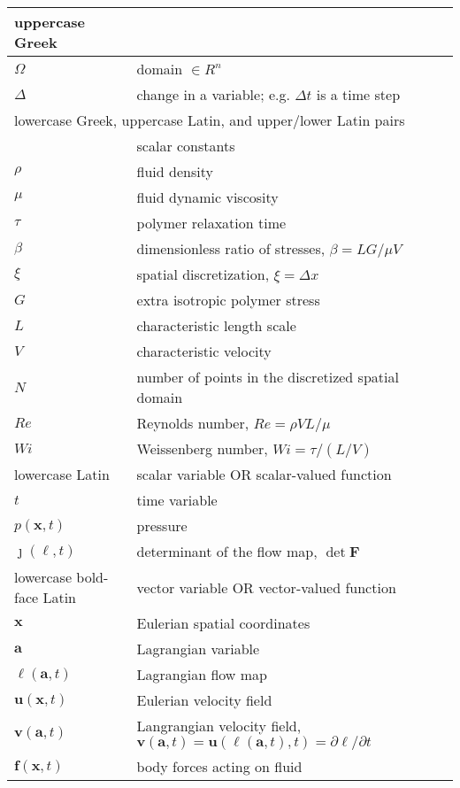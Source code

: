 \documentclass[12pt]{article}
\newcommand{\bx}{{\mathbf x}}
\newcommand{\ba}{{\mathbf a}}
\newcommand{\bl}{{\pmb \ell}}
\newcommand{\bu}{{\mathbf u}}
\newcommand{\bv}{{\mathbf v}}
\newcommand{\ff}{{\mathbf f}}
\newcommand{\bF}{{\mathbf F}}
\begin{document}
	\begin{center}
	\begin{tabular}{|ll|}
		\hline
		uppercase Greek &   \\
		\hline
		$\Omega$ & domain $ \in R^n$\\
		$\Delta$ & change in a variable; e.g. $\Delta t$ is a time step\\
		\hline
		\multicolumn{2}{|l|}{lowercase Greek, uppercase Latin, and upper/lower Latin pairs} \\
		&  scalar constants \\
		\hline
		$\rho$ & fluid density\\
		$\mu$ & fluid dynamic viscosity\\
		$\tau$ & polymer relaxation time\\
		$\beta$ & dimensionless ratio of stresses, $\beta = LG/\mu V$\\
		$\xi$ & spatial discretization, $\xi = \Delta x$\\
		\hline
		$G$ & extra isotropic polymer stress\\
		$L$ & characteristic length scale\\
		$V$ & characteristic velocity \\
		$N$ & number of points in the discretized spatial domain \\
		\hline
		$Re$ & Reynolds number, $ Re = \rho V L/ \mu$ \\
		$Wi$ & Weissenberg number, $ Wi = \tau/(L/V)$ \\
		\hline
		lowercase Latin &  scalar variable OR scalar-valued function\\
		\hline
		$t$  & time variable \\
		$p(\bx,t)$ & pressure \\
		$\jmath(\bl,t)$ & determinant of the flow map, $\det \bF$ \\
		\hline
		lowercase bold-face Latin &  vector variable OR vector-valued function \\
		\hline
		$\bx$ & Eulerian spatial coordinates \\
		$\ba$ & Lagrangian variable \\
		$\bl(\ba,t)$ & Lagrangian flow map \\
		$\bu(\bx,t)$ & Eulerian velocity field \\
		$\bv(\ba,t)$ & Langrangian velocity field, $\bv(\ba,t) = \bu(\bl(\ba,t),t) = \partial \bl /\partial t$\\
		$\ff(\bx,t)$ & body forces acting on fluid \\
		\hline

\end{tabular}
\end{center}
\end{document}
